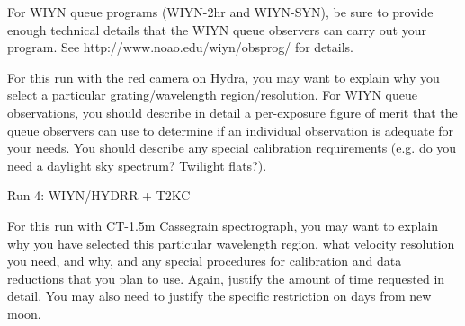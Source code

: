 


\technicaldescription
For WIYN queue programs (WIYN-2hr and WIYN-SYN), be sure to provide enough 
technical details that
the WIYN queue observers can carry out your program.  See 
http://www.noao.edu/wiyn/obsprog/ for details.

For this run with the red camera on Hydra, you may want to explain
why you select a particular grating/wavelength region/resolution.
For WIYN queue observations, you should describe in detail a
per-exposure figure of merit that the queue observers can use
to determine if an individual observation is adequate for your
needs.  You should describe any special calibration requirements
(e.g. do you need a daylight sky spectrum?  Twilight flats?).

\begin{configuration}
\filters{}
\crossdisperser{}       
\slit{}
\multislit{}            
\corrector{}            
\collimator{}             
\adc{}
\end{configuration}

\specialrequest

\begin{targettable}{Run 4: WIYN/HYDRR + T2KC}



\obscomment{}

\end{targettable}






\technicaldescription
For this run with CT-1.5m Cassegrain spectrograph,
you may want to explain why you have selected this
particular wavelength region, what velocity resolution you need,
and why, and any special procedures for calibration and data
reductions that you plan to use.  Again, justify the amount
of time requested in detail.  You may also need to justify
the specific restriction on days from new moon.

